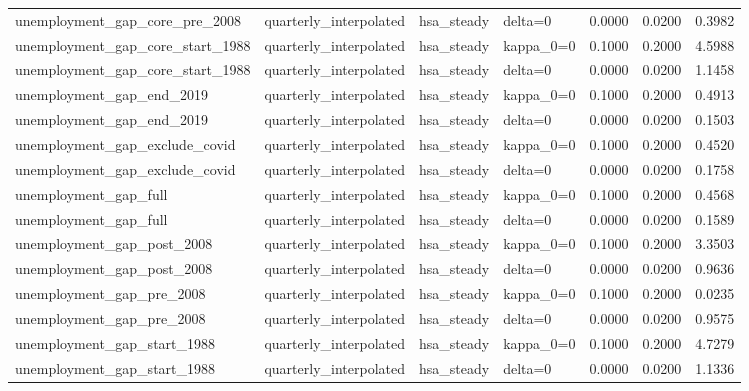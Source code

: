 \begin{tabular}{llllrrr}
unemployment\_gap\_core\_pre\_2008 & quarterly\_interpolated & hsa\_steady & delta=0 & 0.0000 & 0.0200 & 0.3982 \\
unemployment\_gap\_core\_start\_1988 & quarterly\_interpolated & hsa\_steady & kappa\_0=0 & 0.1000 & 0.2000 & 4.5988 \\
unemployment\_gap\_core\_start\_1988 & quarterly\_interpolated & hsa\_steady & delta=0 & 0.0000 & 0.0200 & 1.1458 \\
unemployment\_gap\_end\_2019 & quarterly\_interpolated & hsa\_steady & kappa\_0=0 & 0.1000 & 0.2000 & 0.4913 \\
unemployment\_gap\_end\_2019 & quarterly\_interpolated & hsa\_steady & delta=0 & 0.0000 & 0.0200 & 0.1503 \\
unemployment\_gap\_exclude\_covid & quarterly\_interpolated & hsa\_steady & kappa\_0=0 & 0.1000 & 0.2000 & 0.4520 \\
unemployment\_gap\_exclude\_covid & quarterly\_interpolated & hsa\_steady & delta=0 & 0.0000 & 0.0200 & 0.1758 \\
unemployment\_gap\_full & quarterly\_interpolated & hsa\_steady & kappa\_0=0 & 0.1000 & 0.2000 & 0.4568 \\
unemployment\_gap\_full & quarterly\_interpolated & hsa\_steady & delta=0 & 0.0000 & 0.0200 & 0.1589 \\
unemployment\_gap\_post\_2008 & quarterly\_interpolated & hsa\_steady & kappa\_0=0 & 0.1000 & 0.2000 & 3.3503 \\
unemployment\_gap\_post\_2008 & quarterly\_interpolated & hsa\_steady & delta=0 & 0.0000 & 0.0200 & 0.9636 \\
unemployment\_gap\_pre\_2008 & quarterly\_interpolated & hsa\_steady & kappa\_0=0 & 0.1000 & 0.2000 & 0.0235 \\
unemployment\_gap\_pre\_2008 & quarterly\_interpolated & hsa\_steady & delta=0 & 0.0000 & 0.0200 & 0.9575 \\
unemployment\_gap\_start\_1988 & quarterly\_interpolated & hsa\_steady & kappa\_0=0 & 0.1000 & 0.2000 & 4.7279 \\
unemployment\_gap\_start\_1988 & quarterly\_interpolated & hsa\_steady & delta=0 & 0.0000 & 0.0200 & 1.1336 \\
\bottomrule
\end{tabular}
